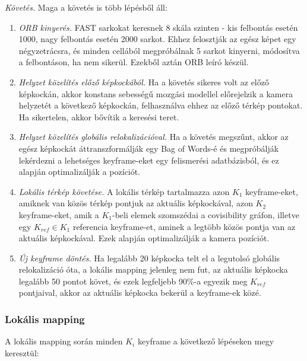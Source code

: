 \textit{Követés.} Maga a követés is több lépésből áll:
\begin{enumerate}
	\item \textit{ORB kinyerés.}  FAST sarkokat keresnek 8 skála szinten - kis felbontás esetén 1000, nagy felbontás esetén 2000 sarkot. Ehhez felosztják az egész képet egy négyzetrácsra, és minden cellából megpróbálnak 5 sarkot kinyerni, módosítva a felbontáson, ha nem sikerül. Ezekből aztán ORB leíró készül.
	\item \textit{Helyzet közelítés előző képkockából.} Ha a követés sikeres volt az előző képkockán, akkor konstans sebességű mozgási modellel előrejelzik a kamera helyzetét a következő képkockán, felhasználva ehhez az előző térkép pontokat. Ha sikertelen, akkor bővítik a keresési teret.
	\item \textit{Helyzet közelítés globális relokalizációval.} Ha a követés megszűnt, akkor az egész képkockát áttranszformálják egy Bag of Words-é és megpróbálják lekérdezni a lehetséges keyframe-eket egy felismerési adatbázisból, és ez alapján optimalizálják a pozíciót.
	\item \textit{Lokális térkép követése.} A lokális térkép tartalmazza azon $K_1$ keyframe-eket, amiknek van közös térkép pontjuk az aktuális képkockával, azon $K_2$ keyframe-eket, amik a $K_1$-beli elemek szomszédai a covisibility gráfon, illetve egy $K_{ref} \in K_1$ referencia keyframe-et, aminek a legtöbb közös pontja van az aktuális képkockával. Ezek alapján optimalizálják a kamera pozíciót.
	\item \textit{Új keyframe döntés.} Ha legalább 20 képkocka telt el a legutolsó globális relokalizáció óta, a lokális mapping jelenleg nem fut, az aktuális képkocka legalább 50 pontot követ, és ezek legfeljebb 90\%-a egyezik meg $K_{ref}$ pontjaival, akkor az aktuális képkocka bekerül a keyframe-ek közé.
\end{enumerate}

\subsubsection{Lokális mapping}

A lokális mapping során minden $K_i$ keyframe a következő lépéseken megy keresztül:

